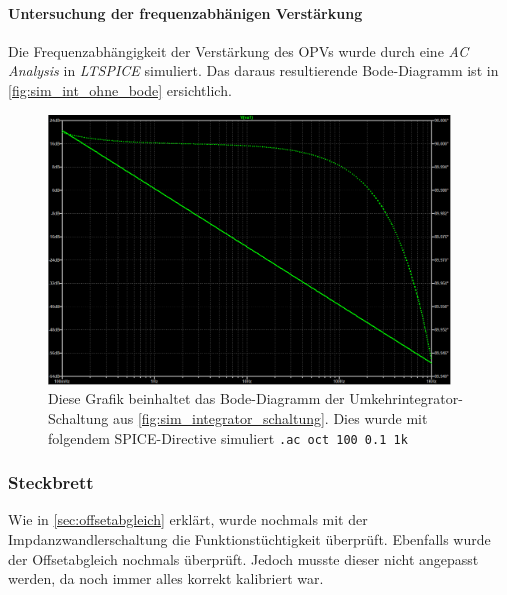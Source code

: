 \documentclass[12pt,english,ngerman]{scrartcl}
\begin{document}
\paragraph{Untersuchung der frequenzabhänigen Verstärkung}
Die Frequenzabhängigkeit der Verstärkung des OPVs wurde durch eine \textit{AC
Analysis} in \textit{LTSPICE} simuliert. Das daraus resultierende Bode-Diagramm
ist in \autoref{fig:sim_int_ohne_bode} ersichtlich.

\begin{figure}[H]
  \centering
    \includegraphics[width=0.95\textwidth]{./figures/integrator/sim/umkehr_int/bode_freq_analysis.png}
    \caption{Diese Grafik beinhaltet das Bode-Diagramm der Umkehrintegrator-Schaltung aus \autoref{fig:sim_integrator_schaltung}. Dies wurde mit folgendem
  SPICE-Directive simuliert \texttt{.ac oct 100 0.1 1k}}
  \label{fig:sim_int_ohne_bode}
\end{figure}


\subsubsection{Steckbrett}
Wie in \autoref{sec:offsetabgleich} erklärt, wurde nochmals mit der
Impdanzwandlerschaltung die Funktionstüchtigkeit überprüft. Ebenfalls wurde
der Offsetabgleich nochmals überprüft. Jedoch musste dieser nicht
angepasst werden, da noch immer alles korrekt kalibriert war.


\end{document}
